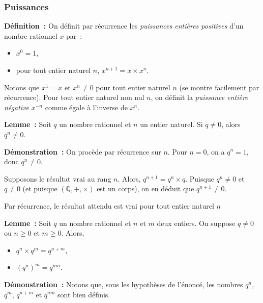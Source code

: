 \done

\subsubsection{Puissances}

\noindent\textbf{Définition :} On définit par récurrence les \emph{puissances entières positives} d'un nombre rationnel $x$ par :
    \begin{itemize}[nosep]
        \item $x^0 = 1$,
        \item pour tout entier naturel $n$, $x^{n+1} = x \times x^n$.
    \end{itemize}
    Notons que $x^1 = x$ et $x^n \neq 0$ pour tout entier naturel $n$ (se montre facilement par récurrence).
    Pour tout entier naturel non nul $n$, on définit la \emph{puissance entière négative} $x^{-n}$ comme égale à l'inverse de $x^n$.

\medskip

\noindent\textbf{Lemme :} Soit $q$ un nombre rationnel et $n$ un entier naturel.
    Si $q \neq 0$, alors $q^n \neq 0$.

\medskip

\noindent\textbf{Démonstration :} On procède par récurrence sur $n$.
    Pour $n = 0$, on a $q^n = 1$, donc $q^n \neq 0$.
    
    Supposons le résultat vrai au rang $n$. 
    Alors, $q^{n+1} = q^n \times q$.
    Puisque $q^n \neq 0$ et $q \neq 0$ (et puisque $(\mathbb{Q}, +, \times)$ est un corps), on en déduit que $q^{n+1} \neq 0$.

    Par récurrence, le résultat attendu est vrai pour tout entier naturel $n$

\done

\medskip

\noindent\textbf{Lemme :} Soit $q$ un nombre rationnel et $n$ et $m$ deux entiers. 
    On suppose $q \neq 0$ ou $n \geq 0$ et $m \geq 0$.
    Alors, 
    \begin{itemize}[nosep]
        \item $q^n \times q^m = q^{n+m}$,
        \item $(q^n)^m = q^{n m}$.
    \end{itemize}

\medskip

\noindent\textbf{Démonstration :}\label{demo:rel_puissances_q} 
Notons que, sous les hypothèses de l'énoncé, les nombres $q^n$, $q^m$, $q^{n+m}$ et $q^{n m}$ sont bien définis.

